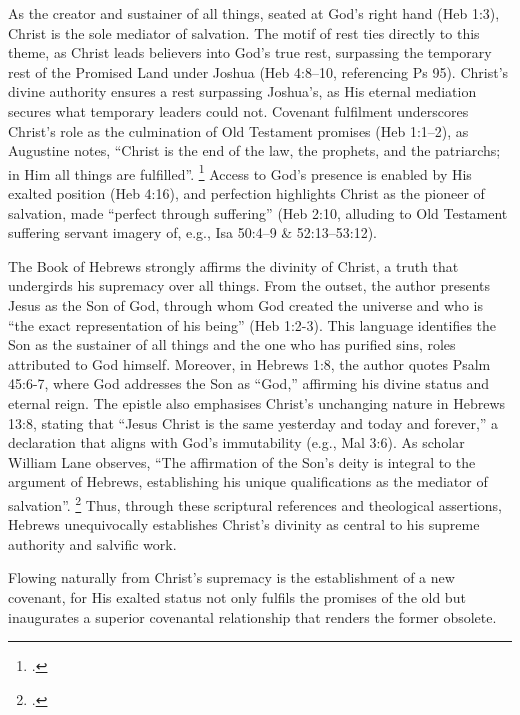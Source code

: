 \documentclass[12pt]{article}
\def\jesus{Yeshua}
\def\christ{the Messiah}
\def\Christ{The Messiah}
\def\jesus{Jesus}
\def\christ{Christ}
\def\Christ{Christ}
\begin{document}
As the creator and sustainer of all things, seated at God’s right hand (Heb
1:3), \christ{} is the sole mediator of salvation.
%
The motif of rest ties directly to this theme, as \christ{} leads believers into
God’s true rest, surpassing the temporary rest of the Promised Land under Joshua
(Heb 4:8--10, referencing Ps 95).
%
\Christ{}’s divine authority ensures a rest surpassing Joshua’s, as His eternal
mediation secures what temporary leaders could not.
Covenant fulfilment underscores \christ{}’s role as the culmination of Old
Testament promises (Heb 1:1--2), as Augustine notes, ``Christ is the end of the
law, the prophets, and the patriarchs; in Him all things are fulfilled''.
\footcite[14.24]{Augustine1887}
Access to God’s presence is enabled by His exalted position (Heb 4:16), and
perfection highlights \christ{} as the pioneer of salvation, made ``perfect
through suffering'' (Heb 2:10, alluding to Old Testament suffering servant
imagery of, e.g., Isa 50:4--9 \& 52:13--53:12).

The Book of Hebrews strongly affirms the divinity of \christ{}, a truth that
undergirds his supremacy over all things. From the outset, the author presents
\jesus{} as the Son of God, through whom God created the universe and who is
``the exact representation of his being'' (Heb 1:2-3).
%
This language identifies the Son as the sustainer of all things and the one who
has purified sins, roles attributed to God himself. Moreover, in Hebrews 1:8,
the author quotes Psalm 45:6-7, where God addresses the Son as ``God,''
affirming his divine status and eternal reign.
%
The epistle also emphasises \christ{}’s unchanging nature in Hebrews 13:8,
stating that ``\jesus{} \christ{} is the same yesterday and today and forever,''
a declaration that aligns with God’s immutability (e.g., Mal 3:6). As scholar
William Lane observes, ``The affirmation of the Son’s deity is integral to the
argument of Hebrews, establishing his unique qualifications as the mediator of
salvation''. \footcite[15]{Lane1991}
%
Thus, through these scriptural references and theological assertions, Hebrews
unequivocally establishes \christ{}’s divinity as central to his supreme
authority and salvific work.

Flowing naturally from \christ{}’s supremacy is the establishment of a new
covenant, for His exalted status not only fulfils the promises of the old but
inaugurates a superior covenantal relationship that renders the former obsolete.
\end{document}
